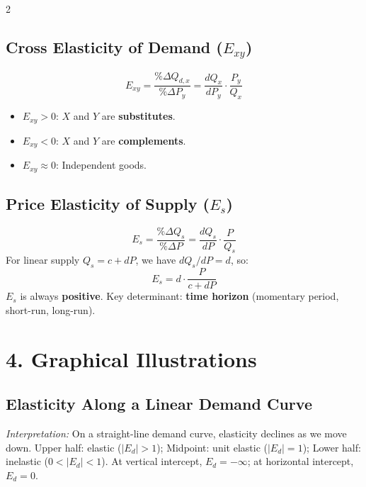 \documentclass[10pt,a4paper]{article}
\begin{document}
\begin{multicols}{2}
\subsection*{Cross Elasticity of Demand ($E_{xy}$)}
\[
E_{xy} = \frac{\%\Delta Q_{d,x}}{\%\Delta P_y} = \frac{dQ_x}{dP_y} \cdot \frac{P_y}{Q_x}
\]
\begin{itemize}[leftmargin=*,nosep]
    \item $E_{xy} > 0$: $X$ and $Y$ are \textbf{substitutes}.
    \item $E_{xy} < 0$: $X$ and $Y$ are \textbf{complements}.
    \item $E_{xy} \approx 0$: Independent goods.
\end{itemize}

\subsection*{Price Elasticity of Supply ($E_s$)}
\[
E_s = \frac{\%\Delta Q_s}{\%\Delta P} = \frac{dQ_s}{dP} \cdot \frac{P}{Q_s}
\]
For linear supply $Q_s = c + dP$, we have $dQ_s/dP = d$, so:
\[
E_s = d \cdot \frac{P}{c + dP}
\]
$E_s$ is always \textbf{positive}. Key determinant: \textbf{time horizon} (momentary period, short-run, long-run).

\section*{4. Graphical Illustrations}

\subsection*{Elasticity Along a Linear Demand Curve}
\begin{center}
\end{center}
\textit{Interpretation:} On a straight-line demand curve, elasticity declines as we move down. Upper half: elastic ($|E_d|>1$); Midpoint: unit elastic ($|E_d|=1$); Lower half: inelastic ($0<|E_d|<1$). At vertical intercept, $E_d = -\infty$; at horizontal intercept, $E_d = 0$.


\end{multicols}
\end{document}
